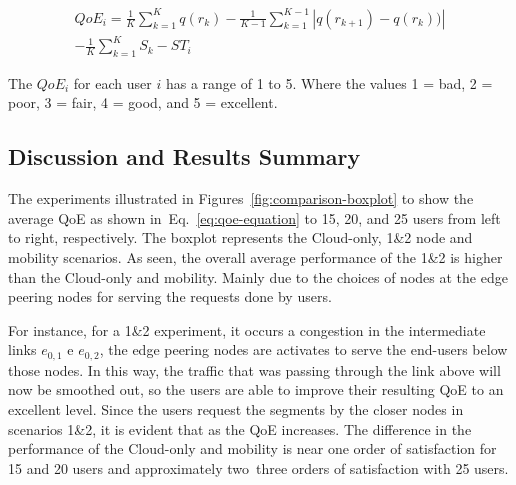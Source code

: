 \begin{equation}\label{eq:qoe-equation}
\begin{split}
QoE_i = \frac{1}{K} \sum_{k=1}^{K}q(r_{k}) - \frac{1}{K-1} \sum_{k=1}^{K-1}|q(r_{k+1}) - q(r_{k}))| \\
- \frac{1}{K}\sum_{k=1}^{K} S_{k} - ST_{i}
\end{split}
\end{equation}

The $QoE_{i}$ for each user $i$ has a range of 1 to 5. Where the values 1 = bad, 2 = poor, 3 = fair, 4 = good, and 5 = excellent.



\subsection{Discussion and Results Summary}


The experiments illustrated in Figures~\ref{fig:comparison-boxplot} to show the average QoE as shown in~Eq.~\ref{eq:qoe-equation} to 15, 20, and 25 users from left to right, respectively. The boxplot represents the Cloud-only, 1\&2 node and mobility scenarios. As seen, the overall average performance of the 1\&2 is higher than the Cloud-only and mobility. Mainly due to the choices of nodes at the edge peering nodes for serving the requests done by users. 

%
For instance, for a 1\&2 experiment, it occurs a congestion in the intermediate links $e_{0,1}$ e $e_{0,2}$, 
the edge peering nodes are activates to serve the end-users below those nodes. In this way, the traffic that was passing through the link above will now be smoothed out, so the users are able to improve their resulting QoE to an excellent level.
%
Since the users request the segments by the closer nodes in scenarios 1\&2, it is
evident that as the QoE increases. %
%
The difference in the performance of the Cloud-only and mobility is near one order of satisfaction for 15 and 20 users and approximately two~three orders of satisfaction with 25 users. 

